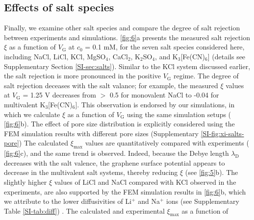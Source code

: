 \subsection{Effects of salt species}
\label{sec:salts}

Finally, we examine other salt species and compare the degree of salt
rejection between experiments and simulations. \Fig{} \ref{fig:6}a
presents the measured salt rejection $\xi$ as a function of
$V_{\mathrm{G}}$ at $c_{0}$ = 0.1 mM, for the seven salt species
considered here, including NaCl, LiCl, KCl, MgSO$_{4}$, CaCl$_{2}$,
K$_{2}$SO$_{4}$, and K$_{3}$[Fe(CN)$_{6}$] (details see Supplementary
Section \ref{SI-sec:salts}). Similar to the KCl system discussed
earlier, the salt rejection is more pronounced in the positive
$V_{\mathrm{G}}$ regime. 
The degree of salt rejection deceases with the salt valance; for
example, the measured $\xi$ values at $V_{\mathrm{G}}$ = 1.25 V
decreases from $>$ 0.5 for monovalent NaCl to -0.04 for multivalent
K$_{3}$[Fe(CN)$_{6}$]. This observation is endorsed by our
simulations, in which we calculate $\xi$ as a function of
$V_{\mathrm{G}}$ using the same simulation setups (\Fig{}
\ref{fig:6}b).  { The effect of pore size distribution is explicitly
  considered using the FEM simulation results with different pore
  sizes (Supplementary \Fig{} \ref{SI-fig:xi-salts-pore})} The
calculated $\xi_{\mathrm{max}}$ values are quantitatively compared
with experiments (\Fig{} \ref{fig:6}c), and the same trend is
observed. Indeed, because the Debye length $\lambda_{\mathrm{D}}$
decreases with the salt valence, the graphene surface potential
appears to decrease in the multivalent salt systems, thereby reducing
$\xi$ (see \Fig{} \ref{fig:5}b).  { The slightly higher $\xi$ values
  of LiCl and NaCl compared with KCl observed in the experiments, are
  also supported by the FEM simulation results in \Fig{} \ref{fig:6}b,
  which we attribute to the lower diffusivities of Li$^{+}$ and
  Na$^{+}$ ions (see Supplementary Table \ref{SI-tab:diff}) }.  The
calculated and experimental $\xi_{\mathrm{max}}$ as a function of

